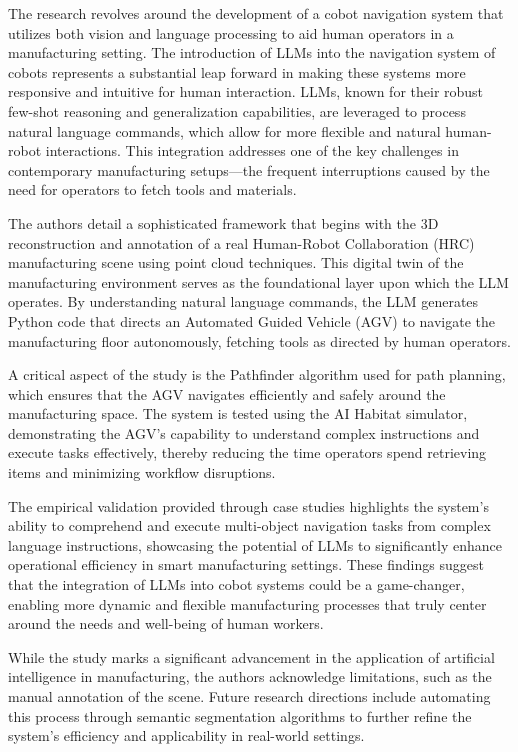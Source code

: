 \documentclass[journal,transmag]{IEEEtran}
\begin{document}
The research revolves around the development of a cobot navigation system that utilizes both vision and language processing to aid human operators in a manufacturing setting. The introduction of LLMs into the navigation system of cobots represents a substantial leap forward in making these systems more responsive and intuitive for human interaction. LLMs, known for their robust few-shot reasoning and generalization capabilities, are leveraged to process natural language commands, which allow for more flexible and natural human-robot interactions. This integration addresses one of the key challenges in contemporary manufacturing setups—the frequent interruptions caused by the need for operators to fetch tools and materials.

The authors detail a sophisticated framework that begins with the 3D reconstruction and annotation of a real Human-Robot Collaboration (HRC) manufacturing scene using point cloud techniques. This digital twin of the manufacturing environment serves as the foundational layer upon which the LLM operates. By understanding natural language commands, the LLM generates Python code that directs an Automated Guided Vehicle (AGV) to navigate the manufacturing floor autonomously, fetching tools as directed by human operators.

A critical aspect of the study is the Pathfinder algorithm used for path planning, which ensures that the AGV navigates efficiently and safely around the manufacturing space. The system is tested using the AI Habitat simulator, demonstrating the AGV’s capability to understand complex instructions and execute tasks effectively, thereby reducing the time operators spend retrieving items and minimizing workflow disruptions.

The empirical validation provided through case studies highlights the system’s ability to comprehend and execute multi-object navigation tasks from complex language instructions, showcasing the potential of LLMs to significantly enhance operational efficiency in smart manufacturing settings. These findings suggest that the integration of LLMs into cobot systems could be a game-changer, enabling more dynamic and flexible manufacturing processes that truly center around the needs and well-being of human workers.

While the study marks a significant advancement in the application of artificial intelligence in manufacturing, the authors acknowledge limitations, such as the manual annotation of the scene. Future research directions include automating this process through semantic segmentation algorithms to further refine the system’s efficiency and applicability in real-world settings.
\end{document}
